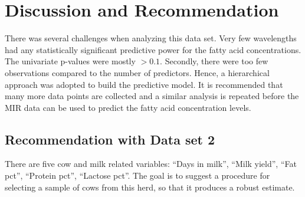 \section*{Discussion and Recommendation} \label{Sec_Discussion}

There was several challenges when analyzing this data set. Very few wavelengths had any statistically significant predictive power for the fatty acid concentrations. The univariate p-values were mostly $> 0.1$. Secondly, there were too few observations compared to the number of predictors. Hence, a hierarchical approach was adopted to build the predictive model. It is recommended that many more data points are collected and a similar analysis is repeated before the MIR data can be used to predict the fatty acid concentration levels. 

\subsection*{Recommendation with Data set 2}
There are five cow and milk related variables: ``Days in milk'', ``Milk yield'', ``Fat pct'', ``Protein pct'', ``Lactose pct''. The goal is to suggest a procedure for selecting a sample of cows from this herd, so that it produces a robust estimate. 

